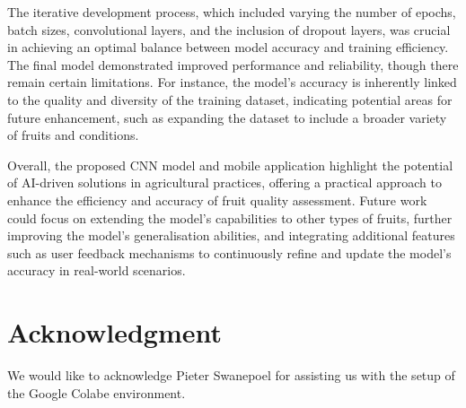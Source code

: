 \documentclass[conference]{IEEEtran}
\begin{document}
The iterative development process, which included varying the number of epochs, batch sizes, convolutional layers, and the inclusion of dropout layers, was crucial in achieving an optimal balance between model accuracy and training efficiency. The final model demonstrated improved performance and reliability, though there remain certain limitations. For instance, the model's accuracy is inherently linked to the quality and diversity of the training dataset, indicating potential areas for future enhancement, such as expanding the dataset to include a broader variety of fruits and conditions.

Overall, the proposed CNN model and mobile application highlight the potential of AI-driven solutions in agricultural practices, offering a practical approach to enhance the efficiency and accuracy of fruit quality assessment. Future work could focus on extending the model's capabilities to other types of fruits, further improving the model's generalisation abilities, and integrating additional features such as user feedback mechanisms to continuously refine and update the model's accuracy in real-world scenarios.

\section*{Acknowledgment}

We would like to acknowledge Pieter Swanepoel for assisting us with the setup of the Google Colabe environment.
\end{document}
